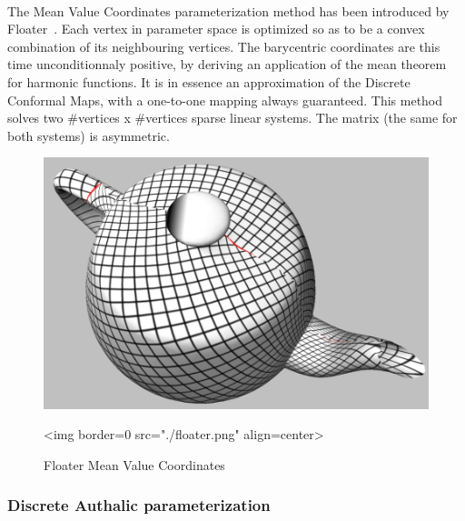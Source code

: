   \\

The Mean Value Coordinates parameterization method has been introduced
by Floater~\cite{cgal:f-mvc-03}. Each vertex in parameter space is
optimized so as to be a convex combination of its neighbouring
vertices. The barycentric coordinates are this time unconditionnaly
positive, by deriving an application of the mean theorem for harmonic
functions. It is in essence an approximation of the Discrete Conformal
Maps, with a one-to-one mapping always guaranteed. This method solves
two \#vertices x \#vertices sparse linear systems. The matrix (the
same for both systems) is asymmetric.

\begin{figure}[bht]
    \begin{center}
        \begin{ccTexOnly}
            \includegraphics{Parameterization/floater} %
        \end{ccTexOnly}
        \begin{ccHtmlOnly}
            <img border=0 src="./floater.png" align=center>
        \end{ccHtmlOnly}
        \label{parameterization-fig-floater}

        \caption{Floater Mean Value Coordinates}
    \end{center}
\end{figure}


\subsubsection{Discrete Authalic parameterization}

